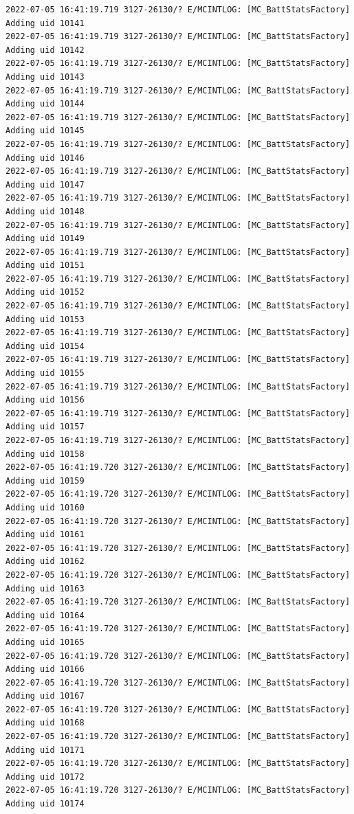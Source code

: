 \documentclass[a4paper,12pt]{book}
\begin{document}
\begin{lstlisting}
2022-07-05 16:41:19.719 3127-26130/? E/MCINTLOG: [MC_BattStatsFactory] Adding uid 10141
2022-07-05 16:41:19.719 3127-26130/? E/MCINTLOG: [MC_BattStatsFactory] Adding uid 10142
2022-07-05 16:41:19.719 3127-26130/? E/MCINTLOG: [MC_BattStatsFactory] Adding uid 10143
2022-07-05 16:41:19.719 3127-26130/? E/MCINTLOG: [MC_BattStatsFactory] Adding uid 10144
2022-07-05 16:41:19.719 3127-26130/? E/MCINTLOG: [MC_BattStatsFactory] Adding uid 10145
2022-07-05 16:41:19.719 3127-26130/? E/MCINTLOG: [MC_BattStatsFactory] Adding uid 10146
2022-07-05 16:41:19.719 3127-26130/? E/MCINTLOG: [MC_BattStatsFactory] Adding uid 10147
2022-07-05 16:41:19.719 3127-26130/? E/MCINTLOG: [MC_BattStatsFactory] Adding uid 10148
2022-07-05 16:41:19.719 3127-26130/? E/MCINTLOG: [MC_BattStatsFactory] Adding uid 10149
2022-07-05 16:41:19.719 3127-26130/? E/MCINTLOG: [MC_BattStatsFactory] Adding uid 10151
2022-07-05 16:41:19.719 3127-26130/? E/MCINTLOG: [MC_BattStatsFactory] Adding uid 10152
2022-07-05 16:41:19.719 3127-26130/? E/MCINTLOG: [MC_BattStatsFactory] Adding uid 10153
2022-07-05 16:41:19.719 3127-26130/? E/MCINTLOG: [MC_BattStatsFactory] Adding uid 10154
2022-07-05 16:41:19.719 3127-26130/? E/MCINTLOG: [MC_BattStatsFactory] Adding uid 10155
2022-07-05 16:41:19.719 3127-26130/? E/MCINTLOG: [MC_BattStatsFactory] Adding uid 10156
2022-07-05 16:41:19.719 3127-26130/? E/MCINTLOG: [MC_BattStatsFactory] Adding uid 10157
2022-07-05 16:41:19.719 3127-26130/? E/MCINTLOG: [MC_BattStatsFactory] Adding uid 10158
2022-07-05 16:41:19.720 3127-26130/? E/MCINTLOG: [MC_BattStatsFactory] Adding uid 10159
2022-07-05 16:41:19.720 3127-26130/? E/MCINTLOG: [MC_BattStatsFactory] Adding uid 10160
2022-07-05 16:41:19.720 3127-26130/? E/MCINTLOG: [MC_BattStatsFactory] Adding uid 10161
2022-07-05 16:41:19.720 3127-26130/? E/MCINTLOG: [MC_BattStatsFactory] Adding uid 10162
2022-07-05 16:41:19.720 3127-26130/? E/MCINTLOG: [MC_BattStatsFactory] Adding uid 10163
2022-07-05 16:41:19.720 3127-26130/? E/MCINTLOG: [MC_BattStatsFactory] Adding uid 10164
2022-07-05 16:41:19.720 3127-26130/? E/MCINTLOG: [MC_BattStatsFactory] Adding uid 10165
2022-07-05 16:41:19.720 3127-26130/? E/MCINTLOG: [MC_BattStatsFactory] Adding uid 10166
2022-07-05 16:41:19.720 3127-26130/? E/MCINTLOG: [MC_BattStatsFactory] Adding uid 10167
2022-07-05 16:41:19.720 3127-26130/? E/MCINTLOG: [MC_BattStatsFactory] Adding uid 10168
2022-07-05 16:41:19.720 3127-26130/? E/MCINTLOG: [MC_BattStatsFactory] Adding uid 10171
2022-07-05 16:41:19.720 3127-26130/? E/MCINTLOG: [MC_BattStatsFactory] Adding uid 10172
2022-07-05 16:41:19.720 3127-26130/? E/MCINTLOG: [MC_BattStatsFactory] Adding uid 10174

\end{lstlisting}
\end{document}
